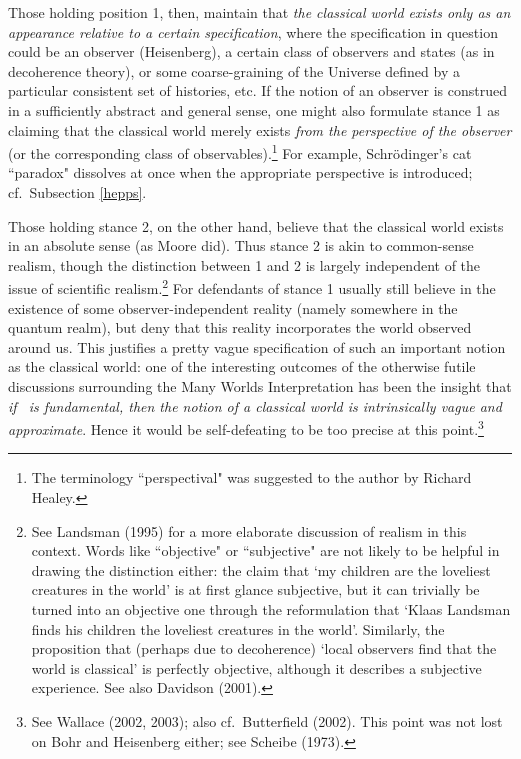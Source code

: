 \documentclass[12pt,titlepage]{article}
\begin{document}
Those holding position 1, then, maintain that {\it the classical world exists only
as an appearance relative to a certain specification}, where the specification in question could be an observer (Heisenberg), a certain class of observers and states (as in decoherence theory), or some  coarse-graining of the Universe defined by a particular consistent set of histories, etc. If the notion of an observer  is construed in a sufficiently abstract and general sense, one might also 
formulate stance 1 as claiming that the classical world merely exists  {\it from the perspective of the observer} (or the corresponding class of observables).\footnote{The  terminology ``perspectival" was suggested to the author by Richard Healey.}  For example,
 Schr\"{o}dinger's cat ``paradox" dissolves at once when the appropriate perspective is introduced; cf.\ Subsection \ref{hepps}. 
 
Those holding stance 2, on the other hand,  believe that the classical world exists in an absolute sense (as Moore did). Thus stance 2 is akin to common-sense realism, though the distinction between 1 and 2 is largely independent of the issue of scientific realism.\footnote{See  Landsman (1995) for a more elaborate discussion of 
realism in this context.  Words like ``objective" or ``subjective" are not likely to be helpful in drawing the distinction either: the claim that `my children are the loveliest creatures in the world' is at first glance subjective, but it can trivially be turned into an objective one through the reformulation that `Klaas Landsman finds his  children the loveliest creatures in the world'. Similarly, the proposition that 
(perhaps due to decoherence)  `local observers find that the world is classical' is perfectly objective, although it describes a subjective experience. See also Davidson (2001). }
For  defendants of stance 1 usually still believe in the existence of some observer-independent reality (namely somewhere in the quantum realm), but deny that this reality incorporates the world observed around us.  This justifies a pretty vague specification of such an important notion as the classical world: one of the interesting outcomes of the otherwise futile discussions surrounding the Many Worlds Interpretation has been the insight that  {\it if \qm\ is fundamental, then the notion of a classical world is intrinsically vague and approximate}. Hence it would be self-defeating to be too precise at this point.\footnote{See Wallace (2002, 2003); also cf.\ Butterfield (2002). This point was not lost on Bohr and Heisenberg either; see Scheibe (1973).}
\end{document}
